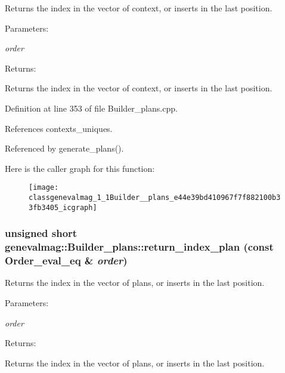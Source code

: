 Returns the index in the vector of context, or inserts in the last position. \begin{Desc}
\item[Parameters:]
\begin{description}
\item[{\em order}]\end{description}
\end{Desc}
\begin{Desc}
\item[Returns:]\end{Desc}
Returns the index in the vector of context, or inserts in the last position. 

Definition at line 353 of file Builder\_\-plans.cpp.

References contexts\_\-uniques.

Referenced by generate\_\-plans().

Here is the caller graph for this function:\nopagebreak
\begin{figure}[H]
\begin{center}
\leavevmode
\texttt{[image: classgenevalmag\_1\_1Builder\_\_plans\_e44e39bd410967f7f882100b33fb3405\_icgraph]}
\end{center}
\end{figure}
\hypertarget{classgenevalmag_1_1Builder__plans_0a0fba0d3630f02c280f9d3997c6bd80}{
\subsubsection[{return\_\-index\_\-plan}]{\setlength{\rightskip}{0pt plus 5cm}unsigned short genevalmag::Builder\_\-plans::return\_\-index\_\-plan (const {\bf Order\_\-eval\_\-eq} \& {\em order})}}
\label{classgenevalmag_1_1Builder__plans_0a0fba0d3630f02c280f9d3997c6bd80}


Returns the index in the vector of plans, or inserts in the last position. \begin{Desc}
\item[Parameters:]
\begin{description}
\item[{\em order}]\end{description}
\end{Desc}
\begin{Desc}
\item[Returns:]\end{Desc}
Returns the index in the vector of plans, or inserts in the last position. 

